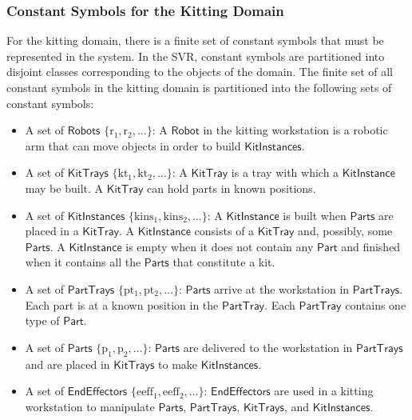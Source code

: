 \documentclass[a4paper, 10pt, conference]{ieeeconf}      %
\begin{document}
\subsubsection{Constant Symbols for the Kitting Domain}
For the kitting domain, there is a finite set of constant symbols that must be represented in the system.
In the SVR, constant symbols are partitioned into disjoint classes corresponding to the objects of the domain. The finite set of all constant symbols in the kitting domain is partitioned into the following sets of constant symbols:
\begin{itemize}
\item A set of $\mathsf{Robots}$ $\lbrace\mathrm{r_1, r_2,\dots\rbrace}$: A $\mathsf{Robot}$ in the kitting workstation is a robotic arm that can move objects in order to build $\mathsf{KitInstances}$.

\item A set of $\mathsf{KitTrays}$ $\lbrace\mathrm{kt_1, kt_2,\dots\rbrace}$: A $\mathsf{KitTray}$ is a tray with which a $\mathsf{KitInstance}$ may be built. A $\mathsf{KitTray}$ can hold parts in known positions.

\item A set of $\mathsf{KitInstances}$ $\lbrace\mathrm{kins_1,kins_2,\dots\rbrace}$: A $\mathsf{KitInstance}$ is built when $\mathsf{Parts}$ are placed in a $\mathsf{KitTray}$. A $\mathsf{KitInstance}$ consists of a $\mathsf{KitTray}$ and, possibly, some $\mathsf{Parts}$. A $\mathsf{KitInstance}$ is empty when it does not contain any $\mathsf{Part}$ and finished when it contains all the $\mathsf{Parts}$ that constitute a kit.

\item A set of $\mathsf{PartTrays}$ $\lbrace\mathrm{pt_1,pt_2,\dots\rbrace}$: $\mathsf{Parts}$ arrive at the workstation in $\mathsf{PartTrays}$. Each part is at a known position in the $\mathsf{PartTray}$. Each $\mathsf{PartTray}$ contains one type of $\mathsf{Part}$.

\item A set of $\mathsf{Parts}$ $\lbrace\mathrm{p_1,p_2,\dots\rbrace}$: $\mathsf{Parts}$ are delivered to the workstation in $\mathsf{PartTrays}$ and are placed in $\mathsf{KitTrays}$ to make $\mathsf{KitInstances}$.

\item A set of $\mathsf{EndEffectors}$ $\lbrace\mathrm{eeff_1,eeff_2,\dots\rbrace}$: $\mathsf{EndEffectors}$ are used in a kitting workstation to manipulate $\mathsf{Parts}$, $\mathsf{PartTrays}$, $\mathsf{KitTrays}$, and $\mathsf{KitInstances}$.


\end{itemize}
\end{document}
